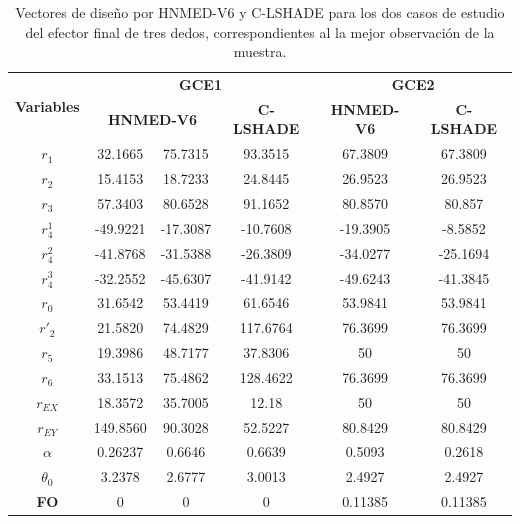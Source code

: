 \begin{table}
	\centering
	\caption{Vectores de diseño por HNMED-V6 y C-LSHADE para los dos casos de estudio del efector final de tres dedos, correspondientes al la mejor observación de la muestra.} \label{Vectores de diseño por HNMED-V6 y C-LSHADE para los dos casos de estudio del efector final de tres dedos, correspondientes al la mejor observación de la muestra.}
	\begin{tabular}{|c|c|c|c|c|c|} 
		\hline
			\multirow{2}{*}{\textbf{Variables}} & \multicolumn{3}{c|}{\textbf{GCE1}} & \multicolumn{2}{c|}{\textbf{GCE2}}   \\ 
		\cline{2-6}
	                &\multicolumn{2}{c|}{\textbf{HNMED-V6}}&\textbf{ C-LSHADE   }&\textbf{ HNMED-V6    } & \textbf{C-LSHADE     }\\ 
		\hline
		$r_1$        & 32.1665 &75.7315 &93.3515    & 67.3809  & 67.3809      \\ 
		\hline
		$r_2$        & 15.4153  &18.7233& 24.8445    & 26.9523  & 26.9523      \\ 
		\hline
		$r_3$        & 57.3403  &80.6528 &91.1652    & 80.8570  & 80.857       \\ 
		\hline
		$r^1_4$       & -49.9221&-17.3087&-10.7608   & -19.3905 & -8.5852      \\ 
		\hline
		$r^2_4$       & -41.8768  &-31.5388& -26.3809   & -34.0277 & -25.1694     \\ 
		\hline
		$r^3_4$       & -32.2552 &-45.6307 &-41.9142   & -49.6243 & -41.3845     \\ 
		\hline
		$r_0$        & 31.6542  &53.4419&61.6546    & 53.9841  & 53.9841      \\ 
		\hline
		$r'_2$       & 21.5820  &74.4829&117.6764   & 76.3699   & 76.3699      \\ 
		\hline
		$r_5$        & 19.3986  &48.7177 &37.8306    & 50           & 50           \\ 
		\hline
		$r_6$        & 33.1513  &75.4862&128.4622   & 76.3699   & 76.3699      \\ 
		\hline
		$r_{EX}$       & 18.3572  &35.7005& 12.18      & 50           & 50           \\ 
		\hline
		$r_{EY}$       & 149.8560  &90.3028& 52.5227    & 80.8429  & 80.8429      \\ 
		\hline
		$\alpha$     & 0.26237  &0.6646& 0.6639     & 0.5093  & 0.2618       \\ 
		\hline
		$\theta_0$    & 3.2378  &2.6777 &3.0013     & 2.4927  & 2.4927       \\ 
		\hline
	\textbf{	FO   }     & 0     &0       & 0          & 0.11385  & 0.11385  \\
		\hline
	\end{tabular}
\end{table}


